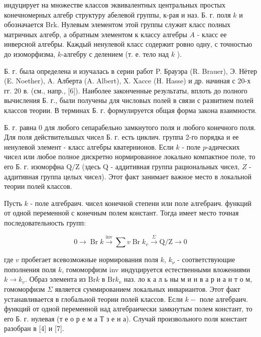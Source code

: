 \documentclass[10pt]{article}
\begin{document}
индуцирует на множестве классов эквивалентных центральных простых конечномерных алгебр структуру абелевой группы, к-рая и наз. Б. г. поля $k$ и обозначается Brk. Нулевым элементом этой группы служит класс полных матричных алгебр, а обратным элементом к классу алгебры $A$ - класс ее инверсной алгебры. Каждый ненулевой класс содержит ровно одну, с точностью до изоморфизма, $k$-алгебру с делением (т. е. тело над $k$ ).



Б. г. была определена и изучалась в серии работ P. Брауэра (R. Brauer), Э. Нётер (E. Noether), A. Алберта (A. Albert), X. Xacce (H. Hasse) и др. начиная с 20-х гг. 20 в. (см., напр., [6]). Наиболее законченные результаты, вплоть до полного вычисления Б. г., были получены для числовых полей в связи с развитием полей классов теории. В терминах Б. г. формулируется общая форма закона взаимности.



Б. г. равна 0 для любого сепарабельно замкнутого поля и любого конечного поля. Для поля действительшых чисел Б. г. есть циклич. группа 2-го порядка и ее ненулевой элемент - класс алгебры кватернионов. Если $k$ - поле $p$-адических чисел или любое полное дискретно нормированное локально компактное поле, то его Б. г. изоморфна $\mathrm{Q} / \mathrm{Z}$ (здесь $\mathrm{Q}$ - аддитивная группа рациональных чисел, $Z$ - аддитивная группа целых чисел). Этот факт занимает важное место в локальной теории полей классов.



Пусть $k$ - поле алгебраич. чисел конечной степени или поле алгебраич. функций от одной переменной с конечным полем констант. Тогда имеет место точная последовательность групп:



\[

0 \longrightarrow \operatorname{Br} k \stackrel{\operatorname{inv}}{\longrightarrow} \sum v \operatorname{Br} k_{v} \stackrel{\Sigma}{\longrightarrow} \mathrm{Q} / \mathrm{Z} \longrightarrow 0

\]



где $v$ пробегает всевозможные нормирования поля $k$, $k_{\nu}$ - соответствующие пополнения поля $k$, гомоморфизм inv индуцируется естественными вложениями $k \rightarrow k_{v}$. Образ элемента из $\mathrm{Br} k$ в $\mathrm{Br} k_{v}$ наз. ло к а л ь ны м и н в а р и а н т о м, гомоморфизм $\Sigma$ является суммированием локальных инвариантов. Этот факт устанавливается в глобальной теории полей классов. Если $k-$ поле алгебраич. функций от одной переменной над алгебраически замкнутым полем констант, то его Б. г. нулевая (т е о р е м а Т з е н а). Случай произвольного поля констант разобран в [4] и [7].
\end{document}
